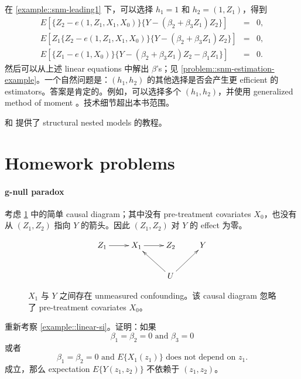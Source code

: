 \begin{example}
\label{example::g-estimation-snm}
在 \cref{example::snm-leading1} 下，可以选择 $h_1 = 1$ 和 $h_2 = (1,Z_1)$，得到
 \begin{eqnarray*}
 E\left[    \{ Z_2 - e(1, Z_1, X_1, X_0)  \}  \{Y-  (\beta_2 + \beta_3 Z_1  ) Z_2\}   \right] &=& 0,
\\
 E\left[   Z_1 \{ Z_2 - e(1, Z_1, X_1, X_0)  \}  \{Y-  (\beta_2 + \beta_3 Z_1  ) Z_2\}   \right] &=& 0,
 \\
 E\left[    \{  Z_1 - e(1, X_0) \}  \{Y- (\beta_2 + \beta_3 Z_1  ) Z_2 - \beta_1  Z_1 \}  \right] &=& 0 . 
 \end{eqnarray*}
 然后可以从上述 linear equations 中解出 $\beta$'s；见 \cref{problem::snm-estimation-example}。一个自然问题是：$(h_1, h_2)$ 的其他选择是否会产生更 efficient 的 estimators。答案是肯定的。例如，可以选择多个 $(h_1, h_2)$，并使用 generalized method of moment \citep{hansen1982large}。技术细节超出本书范围。
\end{example}

 
\citet{naimi2017introduction} 和 \citet{vansteelandt2014structural} 提供了 structural nested models 的教程。
 
  
  
\section{Homework problems}

\paragraph{g-null paradox}\label{problem::g-null-paradox}


考虑 \cref{fig::si-g-null-paradox} 中的简单 causal diagram；其中没有 pre-treatment covariates $X_0$，也没有从 $(Z_1, Z_2)$ 指向 $Y$ 的箭头。因此 $(Z_1,Z_2)$ 对 $Y$ 的 effect 为零。

\begin{figure}
\bigskip 
$$
 \xymatrix{
 Z_1 \ar[r]   & X_1   \ar[r]  & Z_2  & Y \\
                                             &                                             &U\ar[lu]\ar[ru]
 }
 $$
 \caption{$X_1$ 与 $Y$ 之间存在 unmeasured confounding。该 causal diagram 忽略了 pre-treatment covariates $X_0$。}\label{fig::si-g-null-paradox}
\end{figure}


重新考察 \cref{example::linear-si}。证明：如果
$$
\beta_1  = \beta_2 = 0  \text{ and }   \beta_3 = 0
$$
或者
$$
\beta_1 = \beta_2 = 0 \text{ and } E\{ X_1(z_1)\}  \text{ does not depend on } z_1.
$$
成立，那么 expectation $E\{ Y(z_1, z_2) \} $ 不依赖于 $(z_1, z_2)$。


